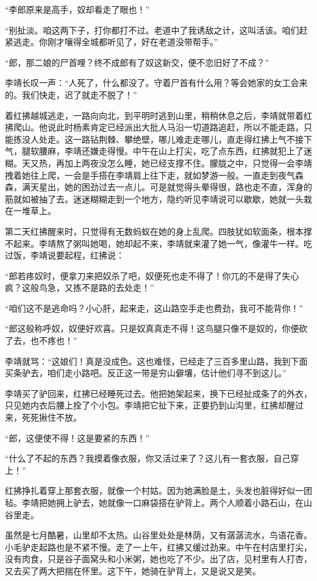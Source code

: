 “李郎原来是高手，奴却看走了眼也！”　

“别扯淡。咱这两下子，打你都打不过。老道中了我诱敌之计，这叫活该。咱们赶紧逃走。你刚才嚷得全城都听见了，好在老道没带帮手。”

“郎，那二娘的尸首哩？终不成郎有了奴这新交，便不恋旧好了不成？”

李靖长叹一声：“人死了，什么都没了。守着尸首有什么用？等会她家的女工会来的。我们快走，迟了就走不脱了！”

着红拂越城逃走，一路向向北，到平明时逃到山里，稍稍休息之后，李靖就带着红拂爬山。他说此时杨素肯定已经派出大批人马沿一切道路追赶，所以不能走路，只能拣没人处走。这一路钻荆棘、攀绝壁，哪儿难走走哪儿，直走得红拂上气不接下气，腿软腰麻，李靖还嫌走得慢。中午在山上打尖，吃了点东西，红拂就犯上了迷糊。天又热，再加上两夜没怎么睡，她已经支撑不住。朦胧之中，只觉得一会李靖拽着她往上爬，一会是手搭在李靖肩上往下走，就如梦游一般。一直走到夜气森森，满天星出，她的困劲过去一点儿。可是就觉得头晕得很，路也走不直，浑身的筋就如被抽了去。迷迷糊糊走到一个地方，隐约听见李靖说可以歇歇，她就一头栽在一堆草上。

第二天红拂醒来时，只觉得有无数蚂蚁在她的身上乱爬。四肢犹如软面条，根本撑不起来。李靖熬了粥叫她喝，她却起不来，李靖就来灌了她一气，像灌牛一样。吃过饭，李靖说要起程，红拂说：

“郎若疼奴时，便拿刀来把奴杀了吧，奴便死也走不得了！你兀的不是得了失心疯？这般鸟急，又拣不是路的去处走！”

“咱们这不是逃命吗？小心肝，起来走，这山路空手走也费劲，我可不能背你！”

“郎这般称呼奴，奴便好欢喜。只是奴真真走不得！这鸟腿只像不是奴的，你便砍了去，也不疼也！”　

李靖就骂：“这娘们！真是没成色。这也难怪，已经走了三百多里山路，我到下面买条驴去，咱们走小路吧。反正这一带是穷山僻壤，估计他们寻不到这儿。”

李靖买了驴回来，红拂已经睡死过去。他把她架起来，换下已经扯成条了的外衣，只见她内衣后腰上拴了个小包。李靖把它扯下来，正要扔到山沟里，红拂却醒过来，死死揪住不放。

“郎，这便使不得！这是要紧的东西！”

“什么了不起的东西？我摸着像衣服，你又活过来了？这儿有一套衣服，自己穿上！”

红拂挣扎着穿上那套衣服，就像一个村姑。因为她满脸是土，头发也脏得好似一团毡。李靖把她拥上驴去，她就像一口麻袋搭在驴背上。两个人顺着小路石山，在山谷里走。

虽然是七月酷暑，山里却不太热。山谷里处处是林荫，又有潺潺流水，鸟语花香。小毛驴走起路也是不紧不慢。走了一上午，红拂又缓过劲来。中午在村店里打尖，没有肉食，只是谷子面窝头和小米粥，她也吃了不少。出了店，见村里有人打杏，又去买了两大把揣在怀里。这下午，她骑在驴背上，又是说又是笑。

